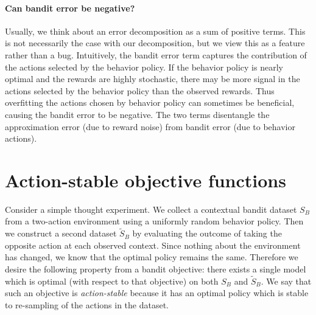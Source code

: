 \paragraph{Can bandit error be negative?}
Usually, we think about an error decomposition as a sum of positive terms.
This is not necessarily the case with our decomposition, but we view this as a feature rather than a bug.
Intuitively, the bandit error term captures the contribution of the actions selected by the behavior policy.
If the behavior policy is nearly optimal and the rewards are highly stochastic, there may be more signal in the actions selected by the behavior policy than the observed rewards.
Thus overfitting the actions chosen by behavior policy can sometimes be beneficial, causing the bandit error to be negative.
The two terms disentangle the approximation error (due to reward noise) from bandit error (due to behavior actions).






\section{Action-stable objective functions}\label{sec:stable}


Consider a simple thought experiment.
We collect a contextual bandit dataset $S_B$ from a two-action environment using a uniformly random behavior policy.
Then we construct a second dataset $\widetilde S_B$ by evaluating the outcome of taking the opposite action at each observed context.
Since nothing about the environment has changed, we know that the optimal policy remains the same.
Therefore we desire the following property from a bandit objective: there exists a single model which is optimal (with respect to that objective) on both $S_B$ and $\widetilde S_B$.
We say that such an objective is \emph{action-stable} because it has an optimal policy which is stable to re-sampling of the actions in the dataset.

